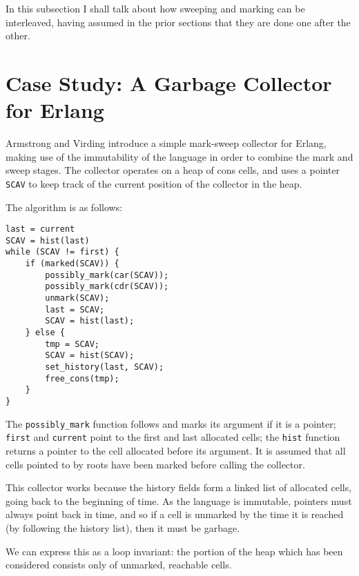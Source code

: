 
In this subsection I shall talk about how sweeping and marking can be
interleaved, having assumed in the prior sections that they are done
one after the other.

\section{Case Study: A Garbage Collector for Erlang}

Armstrong and Virding\cite{Armstrong95} introduce a simple
\gls{mark-sweep} \gls{collector} for Erlang, making use of the
immutability of the language in order to combine the mark and sweep
stages. The \gls{collector} operates on a \gls{heap} of cons cells,
and uses a \gls{pointer} \texttt{SCAV} to keep track of the current
position of the \gls{collector} in the heap.

The algorithm is as follows:

\begin{lstlisting}
last = current
SCAV = hist(last)
while (SCAV != first) {
    if (marked(SCAV)) {
        possibly_mark(car(SCAV));
        possibly_mark(cdr(SCAV));
        unmark(SCAV);
        last = SCAV;
        SCAV = hist(last);
    } else {
        tmp = SCAV;
        SCAV = hist(SCAV);
        set_history(last, SCAV);
        free_cons(tmp);
    }
}
\end{lstlisting}


The \texttt{possibly\_mark} function follows and marks its argument if
it is a pointer; \texttt{first} and \texttt{current} point to the
first and last allocated \glspl{cell}; the \texttt{hist} function
returns a \gls{pointer} to the \gls{cell} allocated before its
argument. It is assumed that all cells pointed to by roots have been
marked before calling the collector.

This \gls{collector} works because the history fields form a linked
list of allocated cells, going back to the beginning of time. As the
language is immutable, pointers must always point back in time, and so
if a cell is unmarked by the time it is reached (by following the
history list), then it must be garbage.

We can express this as a loop invariant: the portion of the heap which
has been considered consists only of unmarked, reachable cells.

